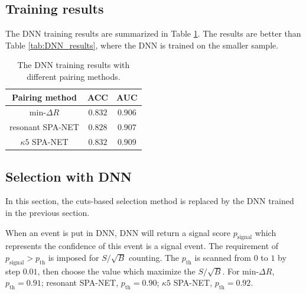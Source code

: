 \documentclass[12pt]{article}
\begin{document}
	\subsection{Training results}%
	\label{sub:training_results}
		The DNN training results are summarized in Table \ref{tab:DNN_results2}. The results are better than Table \ref{tab:DNN_results}, where the DNN is trained on the smaller sample.
		\begin{table}[htpb]
			\centering
			\caption{The DNN training results with different pairing methods.}
			\label{tab:DNN_results2}
			\begin{tabular}{c|cc}
			Pairing method        & ACC     & AUC   \\ \hline
			$\text{min-}\Delta R$ & $0.832$ & $0.906$ \\
			resonant SPA-NET      & $0.828$ & $0.907$ \\
			$\kappa 5$ SPA-NET    & $0.832$ & $0.909$
			\end{tabular}      
		\end{table}
	
	\subsection{Selection with DNN}%
	\label{sub:selection_with_dnn}
		In this section, the cuts-based selection method is replaced by the DNN trained in the previous section. 

		When an event is put in DNN, DNN will return a signal score $p_{\text{signal}}$ which represents the confidence of this event is a signal event. The requirement of $p_{\text{signal}} > p_{\text{th}}$ is imposed for $S / \sqrt{B}$ counting. The $p_{\text{th}}$ is scanned from $0$ to $1$ by step $0.01$, then choose the value which maximize the  $S / \sqrt{B}$. For $\text{min-}\Delta R$, $p_{\text{th}} = 0.91$; resonant SPA-NET, $p_{\text{th}} = 0.90$; $\kappa 5$ SPA-NET, $p_{\text{th}} = 0.92$.
\end{document}
